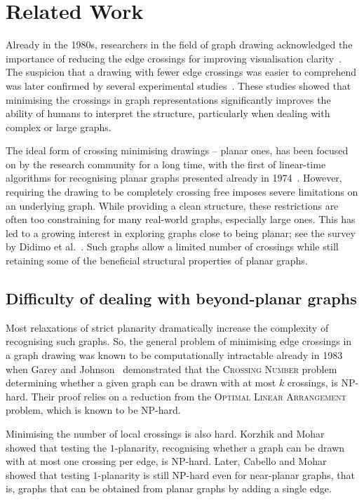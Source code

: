 \chapter{Related Work}\label{ch:related-work}

Already in the 1980s, researchers in the field of graph drawing acknowledged the importance of reducing the edge crossings for improving visualisation clarity~\cite{early-few-crossing}. The suspicion that a drawing with fewer edge crossings was easier to comprehend was later confirmed by several experimental studies~\cite{graph-aesthetic-survey}. These studies showed that minimising the crossings in graph representations significantly improves the ability of humans to interpret the structure, particularly when dealing with complex or large graphs.

The ideal form of crossing minimising drawings -- planar ones, has been focused on by the research community for a long time, with the first of linear-time algorithms for recognising planar graphs presented already in 1974~\cite{linear-p}. However, requiring the drawing to be completely crossing free imposes severe limitations on an underlying graph. While providing a clean structure, these restrictions are often too constraining for many real-world graphs, especially large ones. This has led to a growing interest in exploring graphs close to being planar; see the survey by Didimo et al.~\cite{beyond-planarity-survey}. Such graphs allow a limited number of crossings while still retaining some of the beneficial structural properties of planar graphs.


\section{Difficulty of dealing with beyond-planar graphs}

Most relaxations of strict planarity dramatically increase the complexity of recognising such graphs. So, the general problem of minimising edge crossings in a graph drawing was known to be computationally intractable already in 1983 when Garey and Johnson~\cite{cr_NPC} demonstrated that the \textsc{Crossing Number} problem determining whether a given graph can be drawn with at most \(k\) crossings, is NP-hard. Their proof relies on a reduction from the \textsc{Optimal Linear Arrangement} problem, which is known to be NP-hard.

Minimising the number of local crossings is also hard. Korzhik and Mohar~\cite{1p-NPH} showed that testing the \(1\)-planarity, recognising whether a graph can be drawn with at most one crossing per edge, is NP-hard. Later, Cabello and Mohar~\cite{one-edge-NPH} showed that testing \(1\)-planarity is still NP-hard even for near-planar graphs, that is, graphs that can be obtained from planar graphs by adding a single edge.


